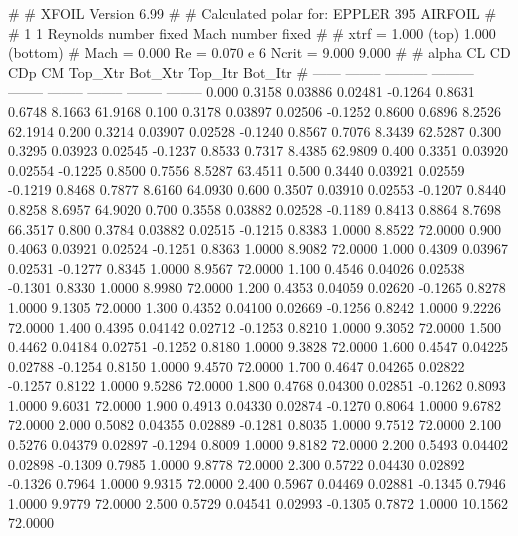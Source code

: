 #  
#       XFOIL         Version 6.99
#  
# Calculated polar for: EPPLER 395 AIRFOIL                              
#  
# 1 1 Reynolds number fixed          Mach number fixed         
#  
# xtrf =   1.000 (top)        1.000 (bottom)  
# Mach =   0.000     Re =     0.070 e 6     Ncrit =   9.000  9.000
#  
#   alpha    CL        CD       CDp       CM     Top_Xtr  Bot_Xtr  Top_Itr  Bot_Itr
#  ------ -------- --------- --------- -------- -------- -------- -------- --------
   0.000   0.3158   0.03886   0.02481  -0.1264   0.8631   0.6748   8.1663  61.9168
   0.100   0.3178   0.03897   0.02506  -0.1252   0.8600   0.6896   8.2526  62.1914
   0.200   0.3214   0.03907   0.02528  -0.1240   0.8567   0.7076   8.3439  62.5287
   0.300   0.3295   0.03923   0.02545  -0.1237   0.8533   0.7317   8.4385  62.9809
   0.400   0.3351   0.03920   0.02554  -0.1225   0.8500   0.7556   8.5287  63.4511
   0.500   0.3440   0.03921   0.02559  -0.1219   0.8468   0.7877   8.6160  64.0930
   0.600   0.3507   0.03910   0.02553  -0.1207   0.8440   0.8258   8.6957  64.9020
   0.700   0.3558   0.03882   0.02528  -0.1189   0.8413   0.8864   8.7698  66.3517
   0.800   0.3784   0.03882   0.02515  -0.1215   0.8383   1.0000   8.8522  72.0000
   0.900   0.4063   0.03921   0.02524  -0.1251   0.8363   1.0000   8.9082  72.0000
   1.000   0.4309   0.03967   0.02531  -0.1277   0.8345   1.0000   8.9567  72.0000
   1.100   0.4546   0.04026   0.02538  -0.1301   0.8330   1.0000   8.9980  72.0000
   1.200   0.4353   0.04059   0.02620  -0.1265   0.8278   1.0000   9.1305  72.0000
   1.300   0.4352   0.04100   0.02669  -0.1256   0.8242   1.0000   9.2226  72.0000
   1.400   0.4395   0.04142   0.02712  -0.1253   0.8210   1.0000   9.3052  72.0000
   1.500   0.4462   0.04184   0.02751  -0.1252   0.8180   1.0000   9.3828  72.0000
   1.600   0.4547   0.04225   0.02788  -0.1254   0.8150   1.0000   9.4570  72.0000
   1.700   0.4647   0.04265   0.02822  -0.1257   0.8122   1.0000   9.5286  72.0000
   1.800   0.4768   0.04300   0.02851  -0.1262   0.8093   1.0000   9.6031  72.0000
   1.900   0.4913   0.04330   0.02874  -0.1270   0.8064   1.0000   9.6782  72.0000
   2.000   0.5082   0.04355   0.02889  -0.1281   0.8035   1.0000   9.7512  72.0000
   2.100   0.5276   0.04379   0.02897  -0.1294   0.8009   1.0000   9.8182  72.0000
   2.200   0.5493   0.04402   0.02898  -0.1309   0.7985   1.0000   9.8778  72.0000
   2.300   0.5722   0.04430   0.02892  -0.1326   0.7964   1.0000   9.9315  72.0000
   2.400   0.5967   0.04469   0.02881  -0.1345   0.7946   1.0000   9.9779  72.0000
   2.500   0.5729   0.04541   0.02993  -0.1305   0.7872   1.0000  10.1562  72.0000

